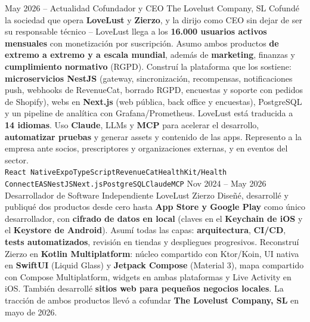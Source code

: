 \documentclass[9pt]{developercv} %
\begin{document}

\begin{entrylist}
	\entry
		{May 2026 -- Actualidad}
		{Cofundador y CEO}
		{The Lovelust Company, SL}
		{Cofundé la sociedad que opera \textbf{LoveLust} y \textbf{Zierzo}, y la dirijo como CEO sin dejar de ser su responsable técnico -- LoveLust llega a los \textbf{16.000 usuarios activos mensuales} con monetización por suscripción. Asumo ambos productos \textbf{de extremo a extremo y a escala mundial}, además de \textbf{marketing}, finanzas y \textbf{cumplimiento normativo} (RGPD). Construí la plataforma que los sostiene: \textbf{microservicios NestJS} (gateway, sincronización, recompensas, notificaciones push, webhooks de RevenueCat, borrado RGPD, encuestas y soporte con pedidos de Shopify), webs en \textbf{Next.js} (web pública, back office y encuestas), PostgreSQL y un pipeline de analítica con Grafana/Prometheus. LoveLust está traducida a \textbf{14 idiomas}. Uso \textbf{Claude}, LLMs y \textbf{MCP} para acelerar el desarrollo, \textbf{automatizar pruebas} y generar assets y contenido de las apps. Represento a la empresa ante socios, prescriptores y organizaciones externas, y en eventos del sector. \\
		\texttt{React Native}\slashsep\texttt{Expo}\slashsep\texttt{TypeScript}\slashsep\texttt{RevenueCat}\slashsep\texttt{HealthKit/Health Connect}\slashsep\texttt{EAS}\slashsep\texttt{NestJS}\slashsep\texttt{Next.js}\slashsep\texttt{PostgreSQL}\slashsep\texttt{Claude}\slashsep\texttt{MCP}}
	\entry
		{Nov 2024 -- May 2026}
		{Desarrollador de Software Independiente}
		{LoveLust \slashsep Zierzo}
		{Diseñé, desarrollé y publiqué dos productos desde cero hasta \textbf{App Store y Google Play} como único desarrollador, con \textbf{cifrado de datos en local} (claves en el \textbf{Keychain de iOS} y el \textbf{Keystore de Android}). Asumí todas las capas: \textbf{arquitectura}, \textbf{CI/CD}, \textbf{tests automatizados}, revisión en tiendas y despliegues progresivos. Reconstruí Zierzo en \textbf{Kotlin Multiplatform}: núcleo compartido con Ktor/Koin, UI nativa en \textbf{SwiftUI} (Liquid Glass) y \textbf{Jetpack Compose} (Material 3), mapa compartido con Compose Multiplatform, widgets en ambas plataformas y Live Activity en iOS. También desarrollé \textbf{sitios web para pequeños negocios locales}. La tracción de ambos productos llevó a cofundar \textbf{The Lovelust Company, SL} en mayo de 2026. \\
}
\end{entrylist}
\end{document}
